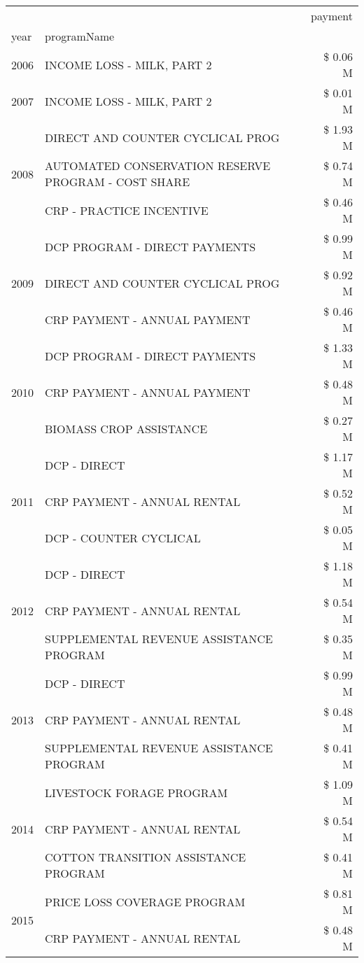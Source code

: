 \begin{tabular}{llr}
\toprule
 &  & payment \\
year & programName &  \\
\midrule
2006 & INCOME LOSS - MILK, PART 2 & \$ 0.06 M \\
\cline{1-3}
2007 & INCOME LOSS - MILK, PART 2 & \$ 0.01 M \\
\cline{1-3}
\multirow[t]{3}{*}{2008} & DIRECT AND COUNTER CYCLICAL PROG & \$ 1.93 M \\
 & AUTOMATED CONSERVATION RESERVE PROGRAM - COST SHARE & \$ 0.74 M \\
 & CRP - PRACTICE INCENTIVE & \$ 0.46 M \\
\cline{1-3}
\multirow[t]{3}{*}{2009} & DCP PROGRAM - DIRECT PAYMENTS & \$ 0.99 M \\
 & DIRECT AND COUNTER CYCLICAL PROG & \$ 0.92 M \\
 & CRP PAYMENT - ANNUAL PAYMENT & \$ 0.46 M \\
\cline{1-3}
\multirow[t]{3}{*}{2010} & DCP PROGRAM - DIRECT PAYMENTS & \$ 1.33 M \\
 & CRP PAYMENT - ANNUAL PAYMENT & \$ 0.48 M \\
 & BIOMASS CROP ASSISTANCE & \$ 0.27 M \\
\cline{1-3}
\multirow[t]{3}{*}{2011} & DCP - DIRECT & \$ 1.17 M \\
 & CRP PAYMENT - ANNUAL RENTAL & \$ 0.52 M \\
 & DCP - COUNTER CYCLICAL & \$ 0.05 M \\
\cline{1-3}
\multirow[t]{3}{*}{2012} & DCP - DIRECT & \$ 1.18 M \\
 & CRP PAYMENT - ANNUAL RENTAL & \$ 0.54 M \\
 & SUPPLEMENTAL REVENUE ASSISTANCE PROGRAM & \$ 0.35 M \\
\cline{1-3}
\multirow[t]{3}{*}{2013} & DCP - DIRECT & \$ 0.99 M \\
 & CRP PAYMENT - ANNUAL RENTAL & \$ 0.48 M \\
 & SUPPLEMENTAL REVENUE ASSISTANCE PROGRAM & \$ 0.41 M \\
\cline{1-3}
\multirow[t]{3}{*}{2014} & LIVESTOCK FORAGE PROGRAM & \$ 1.09 M \\
 & CRP PAYMENT - ANNUAL RENTAL & \$ 0.54 M \\
 & COTTON TRANSITION ASSISTANCE PROGRAM & \$ 0.41 M \\
\cline{1-3}
\multirow[t]{3}{*}{2015} & PRICE LOSS COVERAGE PROGRAM & \$ 0.81 M \\
 & CRP PAYMENT - ANNUAL RENTAL & \$ 0.48 M \\

\end{tabular}
